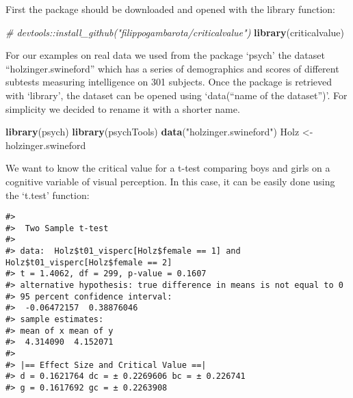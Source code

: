\documentclass[
  man]{apa7}
\newenvironment{Shaded}{\begin{snugshade}}{\end{snugshade}}
\newcommand{\AttributeTok}[1]{\textcolor[rgb]{0.13,0.29,0.53}{#1}}
\newcommand{\CommentTok}[1]{\textcolor[rgb]{0.56,0.35,0.01}{\textit{#1}}}
\newcommand{\DecValTok}[1]{\textcolor[rgb]{0.00,0.00,0.81}{#1}}
\newcommand{\FunctionTok}[1]{\textcolor[rgb]{0.13,0.29,0.53}{\textbf{#1}}}
\newcommand{\NormalTok}[1]{#1}
\newcommand{\OtherTok}[1]{\textcolor[rgb]{0.56,0.35,0.01}{#1}}
\newcommand{\SpecialCharTok}[1]{\textcolor[rgb]{0.81,0.36,0.00}{\textbf{#1}}}
\newcommand{\StringTok}[1]{\textcolor[rgb]{0.31,0.60,0.02}{#1}}
\begin{document}
First the package should be downloaded and opened with the library function:

\begin{Shaded}
\begin{Highlighting}[]
\CommentTok{\# devtools::install\_github("filippogambarota/criticalvalue")}
\FunctionTok{library}\NormalTok{(criticalvalue)}
\end{Highlighting}
\end{Shaded}

For our examples on real data we used from the package `psych' the dataset ``holzinger.swineford'' which has a series of demographics and scores of different subtests measuring intelligence on 301 subjects. Once the package is retrieved with `library', the dataset can be opened using `data(``name of the dataset'')'. For simplicity we decided to rename it with a shorter name.

\begin{Shaded}
\begin{Highlighting}[]
\FunctionTok{library}\NormalTok{(psych)}
\FunctionTok{library}\NormalTok{(psychTools)}
\FunctionTok{data}\NormalTok{(}\StringTok{"holzinger.swineford"}\NormalTok{)}
\NormalTok{Holz }\OtherTok{\textless{}{-}}\NormalTok{ holzinger.swineford}
\end{Highlighting}
\end{Shaded}

We want to know the critical value for a t-test comparing boys and girls on a cognitive variable of visual perception. In this case, it can be easily done using the `t.test' function:

\begin{Shaded}
\end{Shaded}

\begin{verbatim}
#> 
#>  Two Sample t-test
#> 
#> data:  Holz$t01_visperc[Holz$female == 1] and Holz$t01_visperc[Holz$female == 2]
#> t = 1.4062, df = 299, p-value = 0.1607
#> alternative hypothesis: true difference in means is not equal to 0
#> 95 percent confidence interval:
#>  -0.06472157  0.38876046
#> sample estimates:
#> mean of x mean of y 
#>  4.314090  4.152071 
#> 
#> |== Effect Size and Critical Value ==| 
#> d = 0.1621764 dc = ± 0.2269606 bc = ± 0.226741 
#> g = 0.1617692 gc = ± 0.2263908
\end{verbatim}
\end{document}
